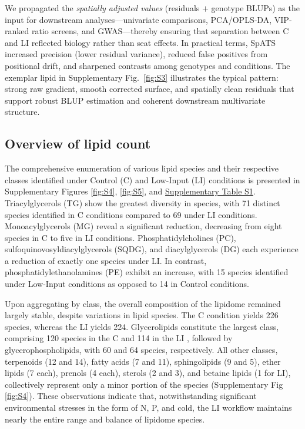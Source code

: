 \documentclass[10pt,letterpaper]{article}
\begin{document}
We propagated the \emph{spatially adjusted values} (residuals $+$ genotype BLUPs) as the input for downstream analyses—univariate comparisons, PCA/OPLS‐DA, VIP‐ranked ratio screens, and GWAS—thereby ensuring that separation between C and LI reflected biology rather than seat effects. In practical terms, SpATS increased precision (lower residual variance), reduced false positives from positional drift, and sharpened contrasts among genotypes and conditions. The exemplar lipid in Supplementary Fig.~\ref{fig:S3} illustrates the typical pattern: strong raw gradient, smooth corrected surface, and spatially clean residuals that support robust BLUP estimation and coherent downstream multivariate structure.




\subsection*{Overview of lipid count}
The comprehensive enumeration of various lipid species and their respective classes identified under Control (C) and Low-Input (LI) conditions is presented in Supplementary Figures \ref{fig:S4}, \ref{fig:S5}, and \href{https://docs.google.com/spreadsheets/d/1SB90-QLYheKEzmHCUIh1UfgkrtbL064s8Oo5BfwFaV0/edit?gid=0#gid=0}{Supplementary Table S1}. Triacylglycerols (TG) show the greatest diversity in species, with 71 distinct species identified in C conditions compared to 69 under LI conditions. Monoacylglycerols (MG) reveal a significant reduction, decreasing from eight species in C to five in LI conditions. Phosphatidylcholines (PC), sulfoquinovosyldiacylglycerols (SQDG), and diacylglycerols (DG) each experience a reduction of exactly one species under LI. In contrast, phosphatidylethanolamines (PE) exhibit an increase, with 15 species identified under Low-Input conditions as opposed to 14 in Control conditions.

Upon aggregating by class, the overall composition of the lipidome remained largely stable, despite variations in lipid species. The C condition yields 226 species, whereas the LI  yields 224. Glycerolipids constitute the largest class, comprising 120 species in the C and 114 in the LI , followed by glycerophospholipids, with 60 and 64 species, respectively. All other classes, terpenoids (12 and 14), fatty acids (7 and 11), sphingolipids (9 and 5), ether lipids (7 each), prenols (4 each), sterols (2 and 3), and betaine lipids (1 for LI), collectively represent only a minor portion of the species (Supplementary Fig \ref{fig:S4}). These observations indicate that, notwithstanding significant environmental stresses in the form of N, P, and cold, the LI workflow maintains nearly the entire range and balance of lipidome species.
\end{document}
